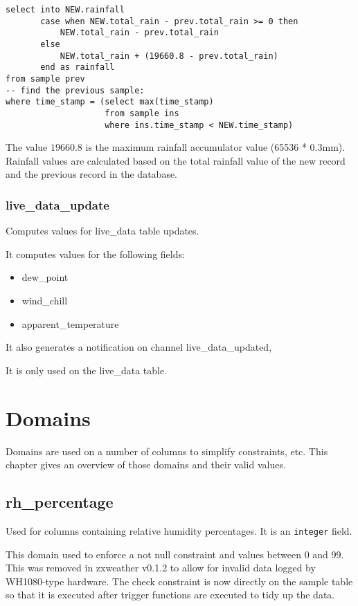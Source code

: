 \documentclass[a4paper,10pt]{book}
\begin{document}
\begin{lstlisting}
select into NEW.rainfall
       case when NEW.total_rain - prev.total_rain >= 0 then
           NEW.total_rain - prev.total_rain
       else
           NEW.total_rain + (19660.8 - prev.total_rain)
       end as rainfall
from sample prev
-- find the previous sample:
where time_stamp = (select max(time_stamp)
                    from sample ins
                    where ins.time_stamp < NEW.time_stamp)
\end{lstlisting}

The value $19660.8$ is the maximum rainfall accumulator value (65536 * 0.3mm). Rainfall values are calculated based on the total rainfall value of the new record and the previous record in the database.

\subsection{live\_data\_update}
Computes values for live\_data table updates.

It computes values for the following fields:
\begin{itemize}
\item dew\_point
\item wind\_chill
\item apparent\_temperature
\end{itemize}

It also generates a notification on channel live\_data\_updated,

It is only used on the live\_data table.

\chapter{Domains}
\label{cha_domains}

Domains are used on a number of columns to simplify constraints, etc. This chapter gives an overview of those domains and their valid values.

\section{rh\_percentage}
\label{rh_percentage}
Used for columns containing relative humidity percentages. It is an \verb|integer| field.

This domain used to enforce a not null constraint and values between 0 and 99. This was removed in zxweather v0.1.2 to allow for invalid data logged by WH1080-type hardware. The check constraint is now directly on the sample table so that it is executed after trigger functions are executed to tidy up the data.
\end{document}
